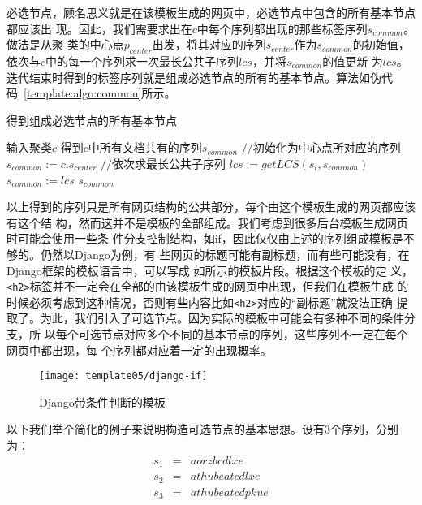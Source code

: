 必选节点，顾名思义就是在该模板生成的网页中，必选节点中包含的所有基本节点都应该出
现。因此，我们需要求出在$c$中每个序列都出现的那些标签序列$s_{common}$。做法是从聚
类的中心点$p_{center}$出发，将其对应的序列$s_{center}$作为$s_{common}$的初始值，
依次与$c$中的每一个序列求一次最长公共子序列$lcs$，并将$s_{common}$的值更新
为$lcs$。迭代结束时得到的标签序列就是组成必选节点的所有的基本节点。算法如伪代
码~\ref{template:algo:common}所示。
\begin{algorithm}
  \caption{得到组成必选节点的所有基本节点}
  \label{template:algo:common}
  \begin{algorithmic}[1]
    \Require 输入聚类$c$
    \Ensure 得到$c$中所有文档共有的序列$s_{common}$
    \State $//$初始化为中心点所对应的序列
    \State $s_{common} := c.s_{center}$
    \State $//$依次求最长公共子序列
    \State $lcs := getLCS(s_i, s_{common})$
    \State $s_{common} := lcs$
    \EndFor
    \State \Return $s_{common}$
    \EndFunction
  \end{algorithmic}
\end{algorithm}

以上得到的序列只是所有网页结构的公共部分，每个由这个模板生成的网页都应该有这个结
构，然而这并不是模板的全部组成。我们考虑到很多后台模板生成网页时可能会使用一些条
件分支控制结构，如if，因此仅仅由上述的序列组成模板是不够的。仍然以Django为例，有
些网页的标题可能有副标题，而有些可能没有，在Django框架的模板语言中，可以写成
如所示的模板片段。根据这个模板的定
义，\texttt{<h2>}标签并不一定会在全部的由该模板生成的网页中出现，但我们在模板生成
的时候必须考虑到这种情况，否则有些内容比如\texttt{<h2>}对应的“副标题”就没法正确
提取了。为此，我们引入了可选节点。因为实际的模板中可能会有多种不同的条件分支，所
以每个可选节点对应多个不同的基本节点的序列，这些序列不一定在每个网页中都出现，每
个序列都对应着一定的出现概率。

\begin{figure}
  \centering
  \texttt{[image: template05/django-if]}
  \caption{Django带条件判断的模板}
  \label{template:fig:django-if}
\end{figure}

以下我们举个简化的例子来说明构造可选节点的基本思想。设有3个序列，分别为：
\begin{eqnarray*}
s_1&=&aorzbcdlxe\\
s_2&=&athubeatcdlxe\\
s_3&=&athubeatcdpkue
\end{eqnarray*}


